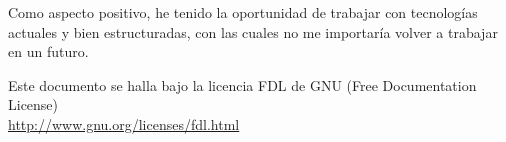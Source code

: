 \documentclass[a4paper,12pt]{article}
\begin{document}
Como aspecto positivo, he tenido la oportunidad de trabajar con tecnologías
actuales y bien estructuradas, con las cuales no me importaría volver a trabajar
en un futuro.




\vspace{0.75cm}

\begin{center}
  {\footnotesize Este documento se halla bajo la licencia FDL de GNU (Free
    Documentation License)\\ \url{http://www.gnu.org/licenses/fdl.html} }   
\end{center}
\end{document}
